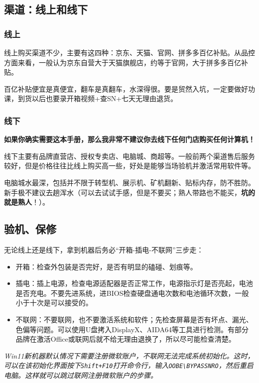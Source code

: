 \documentclass[../main.tex]{subfiles}
\begin{document}
\subsection{渠道：线上和线下}

\subsubsection{线上}

线上购买渠道不少，主要有这四种：京东、天猫、官网、拼多多百亿补贴。从品控方面来看，一般认为京东自营大于天猫旗舰店，约等于官网，大于拼多多百亿补贴。

百亿补贴便宜是真便宜，翻车是真翻车，水深得很。要是贸然入坑，一定要做好功课，到货以后也要录开箱视频+查SN+七天无理由退货。

\subsubsection{线下}

\textbf{如果你确实需要这本手册，那么我非常不建议你去线下任何门店购买任何计算机！}

线下主要有品牌直营店、授权专卖店、电脑城、商超等。一般前两个渠道售后服务较好，但是价格往往比线上购买高一些，好处是能够当场验机并激活常用软件等。

电脑城水最深，包括并不限于转型机、展示机、矿机翻新、贴标内存，防不胜防。新手极不建议去趟浑水（可以去试试手感，但是不要买；熟人带路也不能买，\textbf{坑的就是熟人}！）。

\subsection{验机、保修}

无论线上还是线下，拿到机器后务必“开箱-插电-不联网”三步走：
\begin{itemize}
  \item 开箱：检查外包装是否完好，是否有明显的磕碰、划痕等。
  \item 插电：插上电源，检查电源适配器是否正常工作，电源指示灯是否亮起，电池是否充电。不要先进系统，进BIOS检查硬盘通电次数和电池循环次数，一般小于十次是可以接受的。
  \item 不联网：不要联网，也不要激活系统和软件；先检查屏幕是否有坏点、漏光、色偏等问题。可以使用U盘拷入DisplayX、AIDA64等工具进行检测。有部分品牌在激活Office或联网后就不给无理由退换了，所以尽可能检查清楚。
\end{itemize}

\textit{Win11新机器默认情况下需要注册微软账户，不联网无法完成系统初始化。这时，可以在该初始化界面按下\texttt{Shift+F10}打开命令行，输入\texttt{OOBE\textbackslash BYPASSNRO}，然后重启电脑。这样就可以跳过联网注册微软账户的步骤。}
\end{document}
